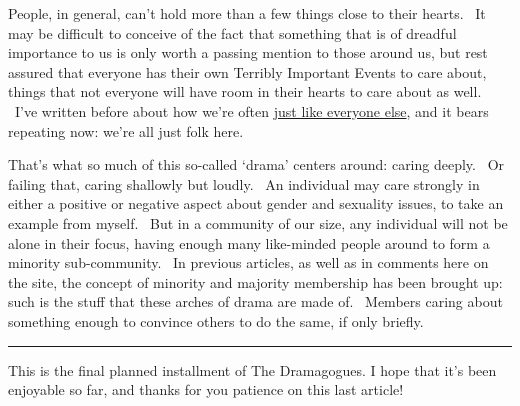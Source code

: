 People, in general, can't hold more than a few things close to their
hearts. ~It may be difficult to conceive of the fact that something that
is of dreadful importance to us is only worth a passing mention to those
around us, but rest assured that everyone has their own Terribly
Important Events to care about, things that not everyone will have room
in their hearts to care about as well. ~I've written before about how
we're often
\href{http://adjectivespecies.com/2011/11/02/makyos-intro-post-just-like-the-rest/}{just
like everyone else}, and it bears repeating now: we're all just folk
here.

That's what so much of this so-called `drama' centers around: caring
deeply. ~Or failing that, caring shallowly but loudly. ~An individual
may care strongly in either a positive or negative aspect about gender
and sexuality issues, to take an example from myself. ~But in a
community of our size, any individual will not be alone in their focus,
having enough many like-minded people around to form a minority
sub-community. ~In previous articles, as well as in comments here on the
site, the concept of minority and majority membership has been brought
up: such is the stuff that these arches of drama are made of. ~Members
caring about something enough to convince others to do the same, if only
briefly.

\begin{center}\rule{0.5\linewidth}{\linethickness}\end{center}

This is the final planned installment of The Dramagogues. I hope that
it's been enjoyable so far, and thanks for you patience on this last
article!

